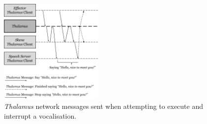 \begin{figure}[H]
	\centering
	\includegraphics[width=0.45\textwidth]{images/SERA_DelayTest.png}
	\caption{\textit{Thalamus} network messages sent when attempting to execute and interrupt a vocalisation.}
	\label{fig:solution:sera_complex_message_delay}
\end{figure}
